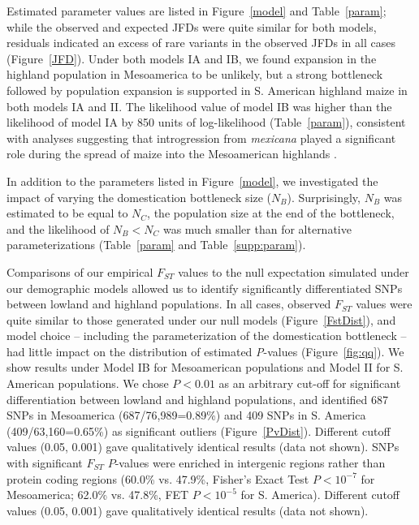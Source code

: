 Estimated parameter values are listed in Figure~\ref{model} and Table~\ref{param}; while the observed and expected JFDs were quite similar for both models,  residuals indicated an excess of rare variants in the observed JFDs in all cases (Figure~\ref{JFD}). 
Under both models IA and IB,  we found expansion in the highland population in Mesoamerica to be unlikely, but a strong bottleneck followed by population expansion is supported in S. American highland maize in both models IA and II.  
The likelihood value of model IB was higher than the likelihood of model IA by 850 units of log-likelihood (Table~\ref{param}), consistent with analyses suggesting that introgression from \textit{mexicana} played a significant role during the spread of maize into the Mesoamerican highlands \cite[]{Profford_2013}. 

In addition to the parameters listed in Figure~\ref{model}, we investigated the impact of varying the domestication bottleneck size ($N_B$).  
Surprisingly, $N_B$ was estimated to be equal to $N_C$, the population size at the end of the bottleneck, and the likelihood of $N_B<N_C$ was much smaller than for alternative parameterizations (Table~\ref{param} and Table~\ref{supp:param}). 

Comparisons of our empirical $F_{ST}$ values to the null expectation simulated under our demographic models allowed us to identify significantly differentiated SNPs between lowland and highland populations. In all cases, observed $F_{ST}$ values were quite similar to those generated under our null models (Figure~\ref{FstDist}), and model choice -- including the parameterization of the domestication bottleneck -- had little impact on the distribution of estimated \emph{P}-values (Figure~\ref{fig:qq}). 
We show results under Model IB for Mesoamerican populations and Model II for S. American populations.
We chose $P<0.01$ as an arbitrary cut-off for significant differentiation between lowland and highland populations, and identified 687 SNPs in Mesoamerica (687/76,989=0.89\%) and 409 SNPs in S. America (409/63,160=0.65\%) as significant outliers (Figure~\ref{PvDist}). Different cutoff values (0.05, 0.001) gave qualitatively identical results (data not shown). SNPs with significant $F_{ST}$ $P$-values were enriched in intergenic regions rather than protein coding regions (60.0\% vs. 47.9\%, Fisher's Exact Test $P < 10^{-7}$ for Mesoamerica; 62.0\% vs. 47.8\%, FET $P<10^{-5}$ for S. America).
Different cutoff values (0.05, 0.001) gave qualitatively identical results (data not shown).


